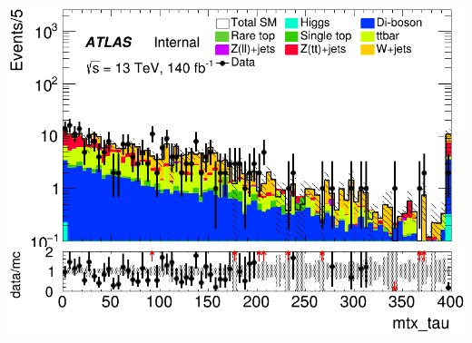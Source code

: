 \documentclass[usenames,dvipsnames]{beamer}
\begin{document}
\begin{frame}
\begin{minipage}{0.32\textwidth}
        \includegraphics[width=\textwidth]{graphics/LHH_met/LHH_met_mtx_tau.png}
    \end{minipage}
\end{frame}
\end{document}
